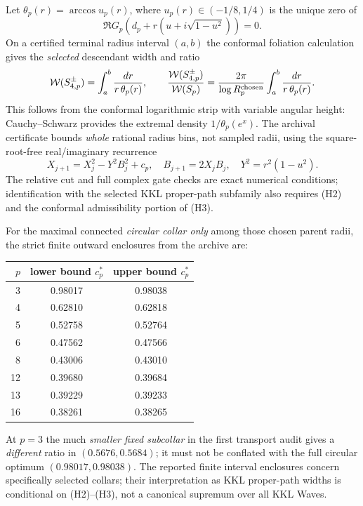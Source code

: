 Let $\theta_p(r)=\arccos u_p(r)$,
where $u_p(r)\in(-1/8,1/4)$ is
the unique zero of
\[
 \Re G_p\!\left(d_p+r
 (u+i\sqrt{1-u^2})\right)=0.
\]
On a certified terminal
radius interval $(a,b)$
the conformal foliation
calculation gives the
\emph{selected} descendant
width and ratio
\begin{equation}\label{eq:crest}
 \mathcal W(S^\pm_{4,p})=
 \int_a^b\frac{dr}{r\,\theta_p(r)},
 \qquad
 \frac{\mathcal W(S^\pm_{4,p})}{\mathcal W(S_p)}
 =\frac{2\pi}{\log R_p^{\rm chosen}}
       \int_a^b\frac{dr}{r\,\theta_p(r)}.
\end{equation}
This follows from the
conformal logarithmic
strip with variable
angular height:
Cauchy--Schwarz
provides the extremal
density $1/\theta_p(e^x)$.
The archival certificate
bounds \emph{whole}
rational radius bins,
not sampled radii, using
the square-root-free
real/imaginary recurrence
\[
 X_{j+1}=X_j^2-Y^2B_j^2+c_p,\quad
 B_{j+1}=2X_jB_j,\quad
 Y^2=r^2(1-u^2).
\]
The relative cut and
full complex gate checks
are exact numerical
conditions; identification
with the selected KKL
proper-path subfamily
also requires (H2)
and the conformal
admissibility portion
of (H3).

For the maximal connected
\emph{circular collar only}
among those chosen
parent radii, the strict
finite outward enclosures
from the archive are:
\begin{center}
\begin{tabular}{rcc}
\toprule
$p$& lower bound $c_p^*$& upper bound $c_p^*$\\\midrule
3&0.98017&0.98038\\
4&0.62810&0.62818\\
5&0.52758&0.52764\\
6&0.47562&0.47566\\
8&0.43006&0.43010\\
12&0.39680&0.39684\\
13&0.39229&0.39233\\
16&0.38261&0.38265\\
\bottomrule
\end{tabular}
\end{center}
At $p=3$ the much
\emph{smaller fixed subcollar}
in the first transport
audit gives a \emph{different}
ratio in $(0.5676,0.5684)$;
it must not be conflated
with the full circular
optimum $(0.98017,0.98038)$.
The reported finite
interval enclosures concern
specifically selected collars;
their interpretation as KKL
proper-path widths is
conditional on (H2)--(H3),
not a canonical supremum
over all KKL Waves.

